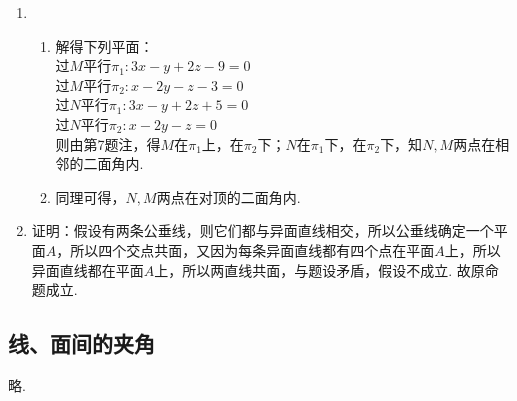 \documentclass[UTF8]{ctexart}
\begin{document}
\begin{enumerate}
\item \begin{enumerate}[(1)]
\item 解得下列平面：\\过$M$平行$\pi_1:3x-y+2z-9=0$\\过$M$平行$\pi_2:x-2y-z-3=0$\\过$N$平行$\pi_1:3x-y+2z+5=0$\\过$N$平行$\pi_2:x-2y-z=0$\\
则由第7题注，得$M$在$\pi_1$上，在$\pi_2$下；$N$在$\pi_1$下，在$\pi_2$下，知$N,M$两点在相邻的二面角内. 
\item 同理可得，$N,M$两点在对顶的二面角内.
\end{enumerate}

\item 证明：假设有两条公垂线，则它们都与异面直线相交，所以公垂线确定一个平面$A$，所以四个交点共面，又因为每条异面直线都有四个点在平面$A$上，所以异面直线都在平面$A$上，所以两直线共面，与题设矛盾，假设不成立. 故原命题成立. 
\end{enumerate}

\subsection{线、面间的夹角}
略.
\end{document}
